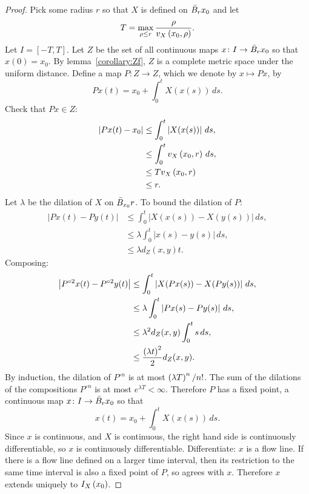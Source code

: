 \begin{proof}
Pick some radius \(r\) so that \(X\) is defined on \(\ballClosed{r}{x_0}\) and let
\[
T=\max_{\rho \le r} \frac{\rho}{v_{X}\left(x_0,\rho\right)}.
\]
Let \(I=[-T,T]\).
Let \(Z\) be the set of all continuous maps \(x \colon I \to \ballClosed{r}{x_0}\) so that \(x(0)=x_0\).
By lemma~\vref{corollary:Zf}, \(Z\) is a complete metric space under the uniform distance.
Define a map \(P \colon Z \to Z\), which we denote by \(x \mapsto Px\), by
\[
Px(t) = x_0 + \int_0^t X(x(s)) \, ds.
\]
Check that \(Px \in Z\):
\begin{align*}
\left|Px(t) - x_0\right| 
&
\le
\int_0^t \left|X(x(s))\right| \, ds,
\\
&\le
\int_0^t v_{X}\left(x_0,r\right) \, ds,
\\
&\le
T v_{X}\left(x_0,r\right)
\\
&
\le r.
\end{align*}
Let \(\lambda\) be the dilation of \(X\) on \(\ballClosed{x_0}{r}\).
To bound the dilation of \(P\):
\begin{align*}
\left|Px(t)-Py(t)\right|
&\le
\int_0^t \left|X(x(s))-X(y(s))\right| \, ds,
\\
&\le
\lambda \int_0^t \left|x(s)-y(s)\right| \, ds,
\\
&\le
\lambda d_Z(x,y) t.
\end{align*}
Composing:
\begin{align*}
\left|P^{\circ 2}x(t)-P^{\circ 2}y(t)\right|
&\le
\int_0^t \left|X(Px(s))-X(Py(s))\right| \, ds,
\\
&\le
\lambda \int_0^t \left|Px(s)-Py(s)\right| \, ds,
\\
&\le
\lambda^2 d_Z(x,y) \int_0^t s \, ds,
\\
&\le \frac{\left(\lambda t\right)^2}{2} d_Z(x,y).
\end{align*}
By induction, the dilation of \(P^{\circ n}\) is at most \(\left(\lambda T\right)^n/n!\).
The sum of the dilations of the compositions \(P^{\circ n}\) is at most \(e^{\lambda T} < \infty\).
Therefore \(P\) has a fixed point, a continuous map \(x \colon I \to \ballClosed{r}{x_0}\) so that 
\[
x(t) = x_0 + \int_0^t X(x(s)) \, ds.
\]
Since \(x\) is continuous, and \(X\) is continuous, the right hand side is continuously differentiable, so \(x\) is continuously differentiable.
Differentiate: \(x\) is a flow line.
If there is a flow line defined on a larger time interval, then its restriction to the same time interval is also a fixed point of \(P\), so agrees with \(x\).
Therefore \(x\) extends uniquely to \(I_X\left(x_0\right)\).
\end{proof}
